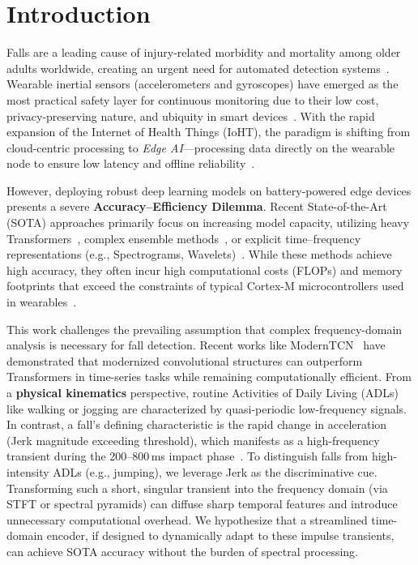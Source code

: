 \documentclass{article}
\begin{document}
\section{Introduction}

Falls are a leading cause of injury-related morbidity and mortality among older adults worldwide, creating an urgent need for automated detection systems~\cite{world2021falls,Newaz2023Methods}. Wearable inertial sensors (accelerometers and gyroscopes) have emerged as the most practical safety layer for continuous monitoring due to their low cost, privacy-preserving nature, and ubiquity in smart devices~\cite{Igual2013Challenges,Chaccour2017Sensors,Casilari2015Wearable}. With the rapid expansion of the Internet of Health Things (IoHT), the paradigm is shifting from cloud-centric processing to \textit{Edge AI}—processing data directly on the wearable node to ensure low latency and offline reliability~\cite{Ramachandran2020Survey,Guo2016Practical}.

However, deploying robust deep learning models on battery-powered edge devices presents a severe \textbf{Accuracy--Efficiency Dilemma}. Recent State-of-the-Art (SOTA) approaches primarily focus on increasing model capacity, utilizing heavy Transformers~\cite{Wang2024Survey,Zerveas2021TST,Wen2023PatchTST}, complex ensemble methods~\cite{Hussain2023Enhanced}, or explicit time--frequency representations (e.g., Spectrograms, Wavelets)~\cite{wang2019deep,mubashir2013survey}. While these methods achieve high accuracy, they often incur high computational costs (FLOPs) and memory footprints that exceed the constraints of typical Cortex-M microcontrollers used in wearables~\cite{Banbury2021TinyML}.

This work challenges the prevailing assumption that complex frequency-domain analysis is necessary for fall detection. Recent works like ModernTCN~\cite{luo2024moderntcn} have demonstrated that modernized convolutional structures can outperform Transformers in time-series tasks while remaining computationally efficient. From a \textbf{physical kinematics} perspective, routine Activities of Daily Living (ADLs) like walking or jogging are characterized by quasi-periodic low-frequency signals. In contrast, a fall's defining characteristic is the rapid change in acceleration (Jerk magnitude exceeding threshold), which manifests as a high-frequency transient during the 200--800\,ms impact phase~\cite{Bourke2007Threshold,Kangas2008Comparison}. To distinguish falls from high-intensity ADLs (e.g., jumping), we leverage Jerk as the discriminative cue. Transforming such a short, singular transient into the frequency domain (via STFT or spectral pyramids) can diffuse sharp temporal features and introduce unnecessary computational overhead. We hypothesize that a streamlined time-domain encoder, if designed to dynamically adapt to these impulse transients, can achieve SOTA accuracy without the burden of spectral processing.
\end{document}
